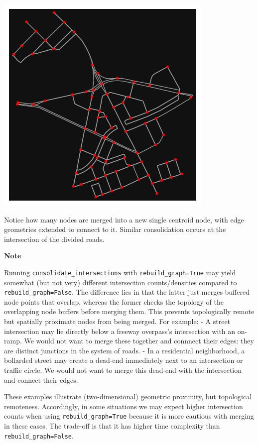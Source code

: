 \documentclass[
  letterpaper,
  DIV=11,
  numbers=noendperiod]{scrreprt}
\begin{document}
\includegraphics{labs/w07_OSM_files/figure-pdf/cell-20-output-1.png}

Notice how many nodes are merged into a new single centroid node, with
edge geometries extended to connect to it. Similar consolidation occurs
at the intersection of the divided roads.

\textbf{Note}

Running \texttt{consolidate\_intersections} with
\texttt{rebuild\_graph=True} may yield somewhat (but not very) different
intersection counts/densities compared to \texttt{rebuild\_graph=False}.
The difference lies in that the latter just merges buffered node points
that overlap, whereas the former checks the topology of the overlapping
node buffers before merging them. This prevents topologically remote but
spatially proximate nodes from being merged. For example: - A street
intersection may lie directly below a freeway overpass's intersection
with an on-ramp. We would not want to merge these together and connnect
their edges: they are distinct junctions in the system of roads. - In a
residential neighborhood, a bollarded street may create a dead-end
immediately next to an intersection or traffic circle. We would not want
to merge this dead-end with the intersection and connect their edges.

These examples illustrate (two-dimensional) geometric proximity, but
topological remoteness. Accordingly, in some situations we may expect
higher intersection counts when using \texttt{rebuild\_graph=True}
because it is more cautious with merging in these cases. The trade-off
is that it has higher time complexity than
\texttt{rebuild\_graph=False}.
\end{document}
